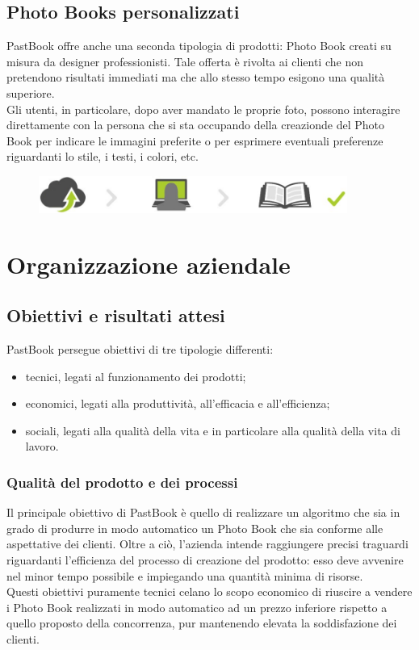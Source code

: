 		\subsection{Photo Books personalizzati}
			PastBook offre anche una seconda tipologia di prodotti: Photo Book creati su misura da designer professionisti. Tale offerta
			è rivolta ai clienti che non pretendono risultati immediati ma che allo stesso tempo esigono una qualità superiore.\\
			Gli utenti, in particolare, dopo aver mandato le proprie foto, possono interagire direttamente con la persona che si sta
			occupando della creazionde del Photo Book per indicare le immagini preferite o per esprimere eventuali preferenze
			riguardanti lo stile, i testi, i colori, etc.
			\begin{figure}[H]
				\centering
				\includegraphics[width=0.9\textwidth]{capitolo_1/immagini/photo_book_personalizzato.png}
			\end{figure}
	\section{Organizzazione aziendale}
		\subsection{Obiettivi e risultati attesi}
			PastBook persegue obiettivi di tre tipologie differenti:
			\begin{itemize}
				\item tecnici, legati al funzionamento dei prodotti;
				\item economici, legati alla produttività, all'efficacia e all'efficienza;
				\item sociali, legati alla qualità della vita e in particolare alla qualità della vita di lavoro.
			\end{itemize}
			\subsubsection{Qualità del prodotto e dei processi}
				Il principale obiettivo di PastBook è quello di realizzare un algoritmo che sia in grado di produrre in modo
				automatico un Photo Book che sia conforme alle aspettative dei clienti. Oltre a ciò, l'azienda intende raggiungere
				precisi traguardi riguardanti l'efficienza del processo di creazione del prodotto: esso deve avvenire nel minor tempo
				possibile e impiegando una quantità minima di risorse.\\
				Questi obiettivi puramente tecnici celano lo scopo economico di riuscire a vendere i Photo Book realizzati in modo
				automatico ad un prezzo inferiore rispetto a quello proposto della concorrenza, pur mantenendo elevata la
				soddisfazione dei clienti.
